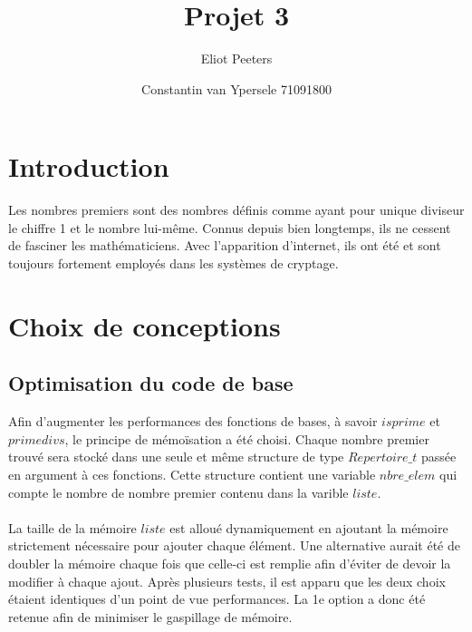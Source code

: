 \documentclass{article}
\title{Projet 3}
\author{Eliot Peeters}
\author{Constantin van Ypersele 71091800}
\begin{document}
\maketitle

\section{Introduction}
Les nombres premiers sont des nombres définis comme ayant pour unique diviseur le chiffre 1 et le nombre lui-même. Connus depuis bien longtemps, ils ne cessent de fasciner les mathématiciens. Avec l'apparition d'internet, ils ont été et sont toujours fortement employés dans les systèmes de cryptage.

\section{Choix de conceptions}

\subsection{Optimisation du code de base}
Afin d'augmenter les performances des fonctions de bases, à savoir $isprime$ et $primedivs$, le principe de mémoïsation a été choisi. Chaque nombre premier trouvé sera stocké dans une seule et même structure de type $Repertoire\_t$ passée en argument à ces fonctions. Cette structure contient une variable $nbre\_elem$ qui compte le nombre de nombre premier contenu dans la varible $liste$. \\ \\
\danger La taille de la mémoire $liste$ est alloué dynamiquement en ajoutant la mémoire strictement nécessaire pour ajouter chaque élément. Une alternative aurait été de doubler la mémoire chaque fois que celle-ci est remplie afin d'éviter de devoir la modifier à chaque ajout. Après plusieurs tests, il est apparu que les deux choix étaient identiques d'un point de vue performances. La 1e option a donc été retenue afin de minimiser le gaspillage de mémoire. 
\end{document}
